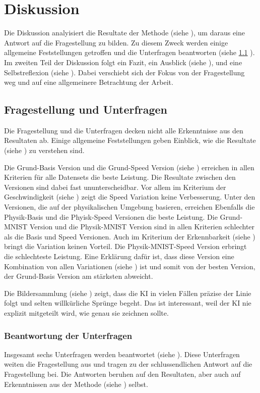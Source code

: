 \chapter{Diskussion}\label{chap:d}
Die Diskussion analyisiert die Resultate der Methode (siehe ),
um daraus eine Antwort auf die Fragestellung zu bilden. Zu diesem Zweck werden
einige allgemeine Feststellungen getroffen  und die Unterfragen beantworten
(siehe \ref{chap:d_frage} ). Im zweiten Teil der Diskussion folgt ein Fazit,
ein Ausblick (siehe ), und eine Selbstreflexion (siehe
). Dabei verschiebt sich der Fokus von der Fragestellung
weg und auf eine allgemeinere Betrachtung der Arbeit.


\section{Fragestellung und Unterfragen}\label{chap:d_frage}
Die Fragestellung und die Unterfragen decken nicht alle Erkenntnisse aus den
Resultaten ab. Einige allgemeine Feststellungen geben Einblick, wie die
Resultate (siehe ) zu verstehen sind. 

Die Grund-Basis Version und die Grund-Speed Version (siehe
) erreichen in allen Kriterien für alle Datensets die
beste Leistung. Die Resultate zwischen den Versionen sind dabei fast
ununterscheidbar. Vor allem im Kriterium der Geschwindigkeit (siehe
) zeigt die Speed Variation keine Verbesserung. Unter
den Versionen, die auf der physikalischen Umgebung basieren, erreichen Ebenfalls
die Physik-Basis und die Phyisk-Speed Versionen die beste Leistung. Die
Grund-MNIST Version und die Physik-MNIST Version sind in allen Kriterien
schlechter als die Basis und Speed Versionen. Auch im Kriterium der
Erkennbarkeit (siehe ) bringt die Variation keinen
Vorteil. Die Physik-MNIST-Speed Version erbringt die schlechteste Leistung. Eine
Erklärung dafür ist, dass diese Version eine Kombination von allen Variationen
(siehe ) ist und somit von der besten Version, der
Grund-Basis Version am stärksten abweicht.

Die Bildersammlung (siehe ) zeigt, dass die KI in vielen
Fällen präzise der Linie folgt und selten willkürliche Sprünge begeht. Das ist
interessant, weil der KI nie explizit mitgeteilt wird, wie genau sie zeichnen
sollte.


\subsection{Beantwortung der Unterfragen}\label{sub:d_frage_unter}
Insgesamt sechs Unterfragen werden beantwortet (siehe ).
Diese Unterfragen weiten die Fragestellung aus und tragen zu der
schlussendlichen Antwort auf die Fragestellung bei. Die Antworten beruhen auf
den Resultaten, aber auch auf Erkenntnissen aus der Methode (siehe
) selbst.


